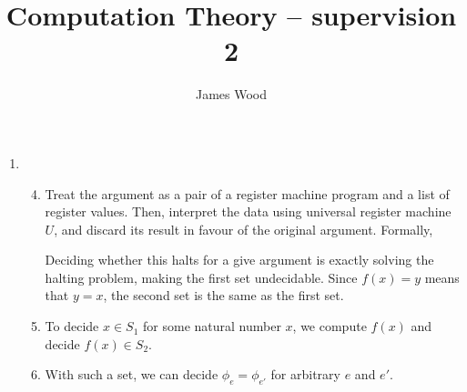 \documentclass{article}
\begin{document}
\title{Computation Theory -- supervision 2}
\author{James Wood}
\maketitle

\begin{enumerate}
  \item
    \begin{enumerate}[label=\arabic*.]
        \setcounter{enumii}{3}
      \item Treat the argument as a pair of a register machine program and a list of register values. Then, interpret the data using universal register machine $U$, and discard its result in favour of the original argument. Formally,


        Deciding whether this halts for a give argument is exactly solving the halting problem, making the first set undecidable. Since $f(x) = y$ means that $y = x$, the second set is the same as the first set.
      \item To decide $x \in S_1$ for some natural number $x$, we compute $f(x)$ and decide $f(x) \in S_2$.
      \item With such a set, we can decide $\phi_e = \phi_{e'}$ for arbitrary $e$ and $e'$.


\end{enumerate}
\end{enumerate}
\end{document}
